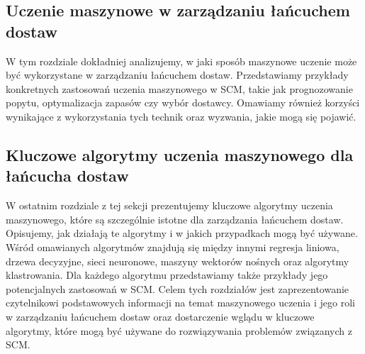\subsection{Uczenie maszynowe w zarządzaniu łańcuchem dostaw}
W tym rozdziale dokładniej analizujemy, w jaki sposób maszynowe uczenie może być wykorzystane w zarządzaniu łańcuchem dostaw. Przedstawiamy przykłady konkretnych zastosowań uczenia maszynowego w SCM, takie jak prognozowanie popytu, optymalizacja zapasów czy wybór dostawcy. Omawiamy również korzyści wynikające z wykorzystania tych technik oraz wyzwania, jakie mogą się pojawić.

\subsection{Kluczowe algorytmy uczenia maszynowego dla łańcucha dostaw}
    W ostatnim rozdziale z tej sekcji prezentujemy kluczowe algorytmy uczenia maszynowego, które są szczególnie istotne dla zarządzania łańcuchem dostaw. Opisujemy, jak działają te algorytmy i w jakich przypadkach mogą być używane. Wśród omawianych algorytmów znajdują się między innymi regresja liniowa, drzewa decyzyjne, sieci neuronowe, maszyny wektorów nośnych oraz algorytmy klastrowania. Dla każdego algorytmu przedstawiamy także przykłady jego potencjalnych zastosowań w SCM.
Celem tych rozdziałów jest zaprezentowanie czytelnikowi podstawowych informacji na temat maszynowego uczenia i jego roli w zarządzaniu łańcuchem dostaw oraz dostarczenie wglądu w kluczowe algorytmy, które mogą być używane do rozwiązywania problemów związanych z SCM.



